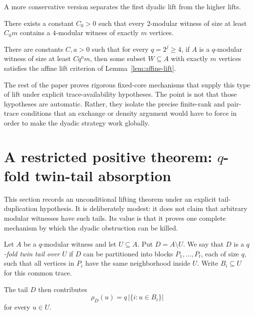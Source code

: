 \documentclass[thmsec,dntnbr,nolinenbrs]{dmgt}
\numberwithin{equation}{section}
\begin{document}
A more conservative version separates the first dyadic lift from the higher lifts.

\begin{conjecture}\label{conj:first-bit}
There exists a constant \(C_0>0\) such that every \(2\)-modular witness of size at least \(C_0m\) contains a \(4\)-modular witness of exactly \(m\) vertices.
\end{conjecture}

\begin{conjecture}\label{conj:higher-bit}
There are constants \(C,a>0\) such that for every \(q=2^j\ge 4\), if \(A\) is a \(q\)-modular witness of size at least \(Cq^a m\), then some subset \(W\subseteq A\) with exactly \(m\) vertices satisfies the affine lift criterion of Lemma~\ref{lem:affine-lift}.
\end{conjecture}

The rest of the paper proves rigorous fixed-core mechanisms that supply this type of lift under explicit trace-availability hypotheses.  The point is not that those hypotheses are automatic.  Rather, they isolate the precise finite-rank and pair-trace conditions that an exchange or density argument would have to force in order to make the dyadic strategy work globally.

\section{A restricted positive theorem: \(q\)-fold twin-tail absorption}

This section records an unconditional lifting theorem under an explicit tail-duplication hypothesis.  It is deliberately modest: it does not claim that arbitrary modular witnesses have such tails.  Its value is that it proves one complete mechanism by which the dyadic obstruction can be killed.

\begin{definition}\label{def:q-fold-tail}
Let \(A\) be a \(q\)-modular witness and let \(U\subseteq A\).  Put \(D=A\setminus U\).  We say that \(D\) is a \emph{\(q\)-fold twin tail over \(U\)} if \(D\) can be partitioned into blocks \(P_1,\ldots,P_t\), each of size \(q\), such that all vertices in \(P_i\) have the same neighborhood inside \(U\).  Write \(B_i\subseteq U\) for this common trace.

The tail \(D\) then contributes
\[
        \rho_D(u)=q\,|\{i:u\in B_i\}|
\]
for every \(u\in U\).
\end{definition}
\end{document}
